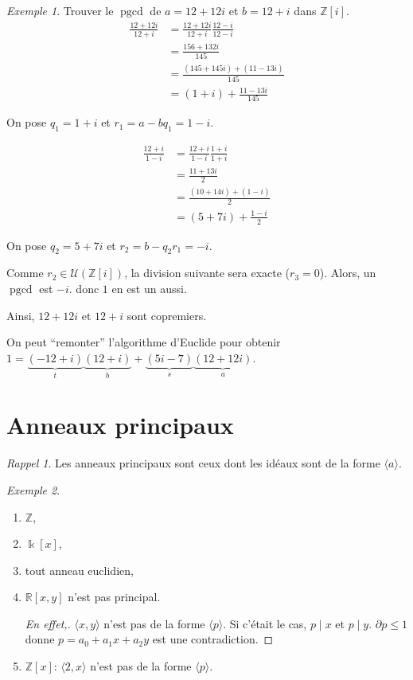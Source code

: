\documentclass{report}
\theoremstyle{definition}
\theoremstyle{remark}
\newtheorem*{exem}{Exemple}
\newtheorem*{rapp}{Rappel}
\newenvironment*{subproof}[1][D\'emonstration]
{
\begin{proof}[#1]

}
{
\renewcommand{\qedsymbol}{$\blacksquare$}
\end{proof}
\renewcommand{\qedsymbol}{$\square$}
}
\def\lte{\leqslant}
\def\ZZ{\mathbb{Z}}
\def\RR{\mathbb{R}}
\def\pgcd{\operatorname{pgcd}}
\begin{document}
	\begin{exem}
		Trouver le $\pgcd$ de $a=12+12i$ et $b=12+i$ dans $\ZZ[i]$.
		\begin{align*}
			\frac{12+12i}{12+i}&= \frac{12+12i}{12+i} \frac{12-i}{12-i}\\
			&= \frac{156+132i}{145}\\
			&= \frac{(145+145i)+(11-13i)}{145}\\
			&= (1+i)+\frac{11-13i}{145}
		\end{align*}

		On pose $q_1=1+i$ et $r_1=a-bq_1=1-i$.

		\begin{align*}
			\frac{12+i}{1-i}&= \frac{12+i}{1-i} \frac{1+i}{1+i}\\
			&= \frac{11+13i}{2}\\
			&= \frac{(10+14i)+(1-i)}{2}\\
			&= (5+7i)+\frac{1-i}{2}
		\end{align*}

		On pose $q_2=5+7i$ et $r_2=b-q_2r_1=-i$.

		Comme $r_2\in\mathcal{U}(\ZZ[i])$, la division suivante sera exacte ($r_3=0$). Alors, un $\pgcd$ est $-i$. donc $1$ en est un aussi.

		Ainsi, $12+12i$ et $12+i$ sont copremiers.

		On peut ``remonter'' l'algorithme d'Euclide pour obtenir $1=\underbrace{(-12+i)}_{t}\underbrace{(12+i)}_{b} + \underbrace{(5i-7)}_{s}\underbrace{(12+12i)}_{a}$.
	\end{exem}

	\section{Anneaux principaux}
	\begin{rapp}
		Les anneaux principaux sont ceux dont les id\'eaux sont de la forme $\langle a \rangle$.
	\end{rapp}

	\begin{exem}
		\begin{enumerate}
			\item $\ZZ$,
			\item $\Bbbk[x]$,
			\item tout anneau euclidien,
			\item $\RR[x,y]$ n'est pas principal.
			\begin{subproof}[En effet,]
				$\langle x,y \rangle$ n'est pas de la forme $\langle p \rangle$. Si c'\'etait le cas, $p \mid x$ et $p \mid y$. $\partial p\lte1$ donne $p=a_0+a_1x+a_2y$ est une contradiction. \lightning
			\end{subproof}
			\item $\ZZ[x]$: $\langle 2,x \rangle$ n'est pas de la forme $\langle p \rangle$.
		\end{enumerate}
	\end{exem}
\end{document}
